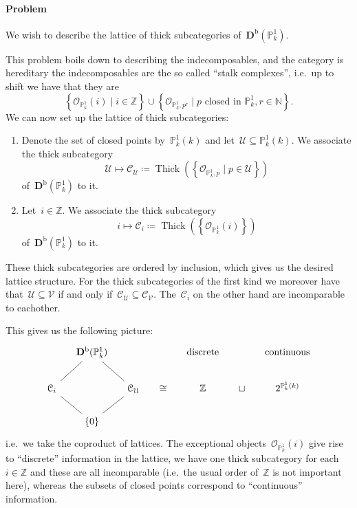 \documentclass[10pt,a4paper]{article}
\theoremstyle{lecture}
\newcommand\bounded{\ensuremath{\mathrm{b}}}
\newcommand\derived{\ensuremath{\mathbf{D}}}
\DeclareMathOperator\Thick{Thick}
\begin{document}
\paragraph{Problem} We wish to describe the lattice of thick subcategories of~$\derived^\bounded(\mathbb{P}_k^1)$.

This problem boils down to describing the indecomposables, and the category is hereditary the indecomposables are the so called ``stalk complexes'', i.e.\ up to shift we have that they are
\begin{equation}
  \left\{ \mathcal{O}_{\mathbb{P}_k^1}(i)\mid i\in\mathbb{Z} \right\}\cup\left\{ \mathcal{O}_{\mathbb{P}_k^1,p^r}\mid\text{$p$ closed in $\mathbb{P}_k^1$}, r\in\mathbb{N} \right\}.
\end{equation}
We can now set up the lattice of thick subcategories:
\begin{enumerate}
  \item Denote the set of closed points by~$\mathbb{P}_k^1(k)$ and let~$\mathcal{U}\subseteq\mathbb{P}_k^1(k)$. We associate the thick subcategory
    \begin{equation}
      \mathcal{U}\mapsto\mathcal{C}_{\mathcal{U}}\coloneqq\Thick\left( \left\{ \mathcal{O}_{\mathbb{P}_k^1,p}\mid p\in\mathcal{U} \right\} \right)
    \end{equation}
    of~$\derived^\bounded(\mathbb{P}_k^1)$ to it.
  \item Let~$i\in\mathbb{Z}$. We associate the thick subcategory
    \begin{equation}
      i\mapsto\mathcal{C}_i\coloneqq\Thick\left( \left\{ \mathcal{O}_{\mathbb{P}_k^1}(i) \right\} \right)
    \end{equation}
    of~$\derived^\bounded(\mathbb{P}_k^1)$ to it.
\end{enumerate}
These thick subcategories are ordered by inclusion, which gives us the desired lattice structure. For the thick subcategories of the first kind we moreover have that~$\mathcal{U}\subseteq\mathcal{V}$ if and only if~$\mathcal{C}_{\mathcal{U}}\subseteq\mathcal{C}_{\mathcal{V}}$. The~$\mathcal{C}_i$ on the other hand are incomparable to eachother.

This gives us the following picture:
\begin{equation}
  \begin{tikzcd}[column sep = small]
    {} & \derived^\bounded(\mathbb{P}_k^1) \arrow[-]{rd} \arrow[-]{ld} & & & \text{discrete} & & \text{continuous} \\
    \mathcal{C}_i \arrow[-]{rd} & & \mathcal{C}_{\mathcal{U}} \arrow[-]{ld} & \cong & \mathbb{Z} & \sqcup & 2^{\mathbb{P}_k^1(k)} \\
    & \left\{ 0 \right\}
  \end{tikzcd}
\end{equation}
i.e.\ we take the coproduct of lattices. The exceptional objects~$\mathcal{O}_{\mathbb{P}_k^1}(i)$ give rise to ``discrete'' information in the lattice, we have one thick subcategory for each~$i\in\mathbb{Z}$ and these are all incomparable (i.e.\ the usual order of~$\mathbb{Z}$ is not important here), whereas the subsets of closed points correspond to ``continuous'' information.
\end{document}
